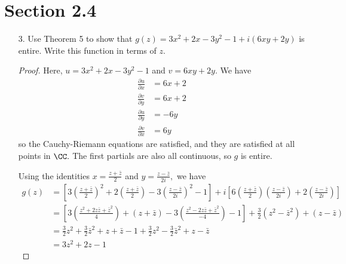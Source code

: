 \documentclass{article}
\begin{document}
\newpage
\section*{Section 2.4}

\begin{itemize}
	\item[3.] Use Theorem 5 to show that $g(z)=3x^2+2x-3y^2-1+i(6xy+2y)$ is entire. Write this function in terms of $z.$
		\begin{proof}
			Here, $u=3x^2+2x-3y^2-1$ and $v=6xy+2y.$ We have
			\begin{align*}
				\frac{\partial u}{\partial x} &= 6x + 2 \\
				\frac{\partial v}{\partial y} &= 6x + 2 \\
				\frac{\partial u}{\partial y} &= -6y \\
				\frac{\partial v}{\partial x} &= 6y
			\end{align*}
			so the Cauchy-Riemann equations are satisfied, and they are satisfied at all points in $\CC.$ The first partials are also all continuous, so $g$ is entire.

			Using the identities $x=\frac{z+\bar z}{2}$ and $y=\frac{z-\bar z}{2i},$ we have
			\begin{align*}
				g(z) &= \left[ 3\left( \frac{z+\bar z}{2} \right)^2 + 2\left( \frac{z+\bar z}{2} \right) - 3\left( \frac{z-\bar z}{2i} \right)^2 - 1 \right] + i\left[ 6\left( \frac{z+\bar z}{2} \right)\left( \frac{z-\bar z}{2i} \right) + 2\left( \frac{z-\bar z}{2i} \right) \right] \\
				&= \left[ 3\left( \frac{z^2+2z\bar z + \bar z^2}{4} \right) + (z+\bar z) - 3\left( \frac{z^2-2z\bar z+\bar z^2}{-4} \right) - 1 \right] + \frac{3}{2}(z^2-\bar z^2) + (z-\bar z) \\
				&= \frac{3}{2}z^2 + \frac{3}{2}\bar z^2 + z + \bar z - 1 + \frac{3}{2}z^2 - \frac{3}{2}\bar z^2 + z - \bar z \\
				&= 3z^2+2z-1
			\end{align*}
		\end{proof}


\end{itemize}
\end{document}
